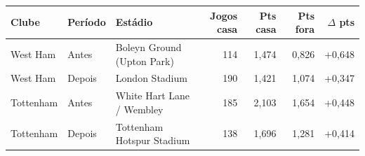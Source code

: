 \begin{tabular}{lllrrrr}
  \toprule
  Clube & Período & Estádio & Jogos casa & Pts casa & Pts fora & $\Delta$ pts \\
  \midrule
  West Ham & Antes & Boleyn Ground (Upton Park) & 114 & 1,474 & 0,826 & +0,648 \\
  West Ham & Depois & London Stadium & 190 & 1,421 & 1,074 & +0,347 \\
  Tottenham & Antes & White Hart Lane / Wembley & 185 & 2,103 & 1,654 & +0,448 \\
  Tottenham & Depois & Tottenham Hotspur Stadium & 138 & 1,696 & 1,281 & +0,414 \\
  \bottomrule
\end{tabular}

